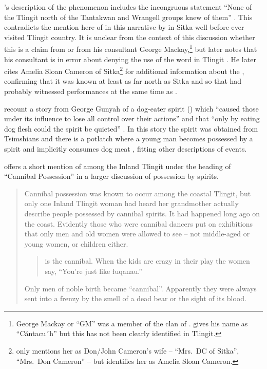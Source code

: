 \citeauthor{olson:1967}’s description of the  phenomenon includes the incongruous statement “None of the Tlingit north of the Tantakwan and Wrangell groups knew of them” \parencite[98]{olson:1967}.
This contradicts the mention here of  in this narrative by  in Sitka well before \citeauthor{olson:1967} ever visited Tlingit country.
It is unclear from the context of this discussion whether this is a claim from \citeauthor{olson:1967} or from his consultant George Mackay,\footnote{George Mackay or “GM” was a member of the  clan of  \parencite[82–83]{olson:1967}.
\citeauthor{olson:1967} gives his name as “Cántacu´h” \parencite[98]{olson:1967} but this has not been clearly identified in Tlingit.} but later \citeauthor{olson:1967} notes that his consultant is in error about denying the use of the word  in Tlingit \parencite[100]{olson:1967}.
He later cites  Amelia Sloan Cameron of Sitka\footnote{\citeauthor{olson:1967} only mentions her as  Don/John Cameron’s wife – “Mrs.\ DC of Sitka”, “Mrs.\ Don Cameron” – but \textcite[130]{jones:2017} identifies her as  Amelia Sloan Cameron.} for additional information about the , confirming that it was known at least as far north as Sitka and so that  had probably witnessed  performances at the same time as .

\citeauthor{garfield-forrest:1948} recount a story from  George Gunyah of a dog-eater spirit () which “caused those under its influence to lose all control over their actions” and that “only by eating dog flesh could the spirit be quieted” \parencite[143]{garfield-forrest:1948}.
In this story the spirit was obtained from Tsimshians and there is a potlatch where a young man becomes possessed by a spirit and implicitly consumes dog meat \parencite[141–145]{garfield-forrest:1948}, fitting other descriptions of  events.

\citeauthor{mcclellan:1975b} offers a short mention of  among the Inland Tlingit under the heading of “Cannibal Possession” in a larger discussion of possession by spirits.

\begin{quote}\small
Cannibal possession was known to occur among the coastal Tlingit, but only one Inland Tlingit woman had heard her grandmother actually describe people possessed by cannibal spirits.
It had happened long ago on the coast.
Evidently those who were cannibal dancers put on exhibitions that only men and old women were allowed to see – not middle-aged or young women, or children either.

\begin{quote}
 is the cannibal.
When the kids are crazy in their play the women say, “You’re just like łuqanau.”
\end{quote}

Only men of noble birth became “cannibal”.
Apparently they were always sent into a frenzy by the smell of a dead bear or the sight of its blood.
\end{quote}

